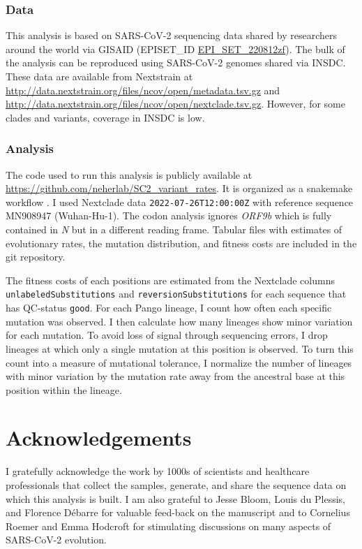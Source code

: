 \documentclass[aps,rmp, twocolumn]{revtex4}
\begin{document}
\subsubsection*{Data}
This analysis is based on SARS-CoV-2 sequencing data shared by researchers around the world via GISAID \citep{shu_gisaid_2017} (EPISET\_ID \href{10.55876/gis8.220812zf}{EPI_SET_220812zf}).
The bulk of the analysis can be reproduced using SARS-CoV-2 genomes shared via INSDC.
These data are available from Nextstrain at \url{http://data.nextstrain.org/files/ncov/open/metadata.tsv.gz} and \url{http://data.nextstrain.org/files/ncov/open/nextclade.tsv.gz}.
However, for some clades and variants, coverage in INSDC is low.

\subsubsection*{Analysis}
The code used to run this analysis is publicly available at \url{https://github.com/neherlab/SC2_variant_rates}.
It is organized as a snakemake workflow \citep{koster_snakemakescalable_2012}.
I used Nextclade data \texttt{2022-07-26T12:00:00Z} with reference sequence MN908947 (Wuhan-Hu-1).
The codon analysis ignores \emph{ORF9b} which is fully contained in \emph{N} but in a different reading frame.
Tabular files with estimates of evolutionary rates, the mutation distribution, and fitness costs are included in the git repository.

The fitness costs of each positions are estimated from the Nextclade columns \texttt{unlabeledSubstitutions} and \texttt{reversionSubstitutions} for each sequence that has QC-status \texttt{good}.
For each Pango lineage, I count how often each specific mutation was observed.
I then calculate how many lineages show minor variation for each mutation.
To avoid loss of signal through sequencing errors, I drop lineages at which only a single mutation at this position is observed.
To turn this count into a measure of mutational tolerance, I normalize the number of lineages with minor variation by the mutation rate away from the ancestral base at this position within the lineage.

\section*{Acknowledgements}
I gratefully acknowledge the work by 1000s of scientists and healthcare professionals that collect the samples, generate, and share the sequence data on which this analysis is built.
I am also grateful to Jesse Bloom, Louis du Plessis, and Florence D\'ebarre for valuable feed-back on the manuscript and to Cornelius Roemer and Emma Hodcroft for stimulating discussions on many aspects of SARS-CoV-2 evolution.
\end{document}
